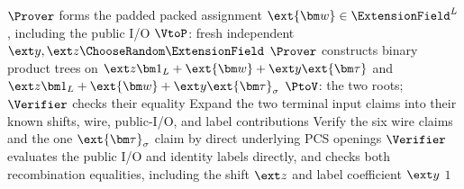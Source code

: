\begin{algorithm}[!t]
\(\Prover\) forms the padded packed assignment
\(\ext{\bm w}\in\ExtensionField^L\), including the public I/O\;
\(\VtoP\): fresh independent
\(\ext y,\ext z\ChooseRandom\ExtensionField\)\;
\(\Prover\) constructs binary product trees on
\(\ext z\bm1_L+\ext{\bm w}+\ext y\ext{\bm\tau}\)
and
\(\ext z\bm1_L+\ext{\bm w}+\ext y\ext{\bm\tau}_\sigma\)\;
\(\PtoV\): the two roots; \(\Verifier\) checks their equality\;
Expand the two terminal input claims into their known shifts,
wire, public-I/O, and label contributions\;
Verify the six wire claims and the one
\(\ext{\bm\tau}_\sigma\) claim by direct underlying PCS openings\;
\(\Verifier\) evaluates the public I/O and identity labels
directly, and checks both recombination equalities, including
the shift \(\ext z\) and label coefficient \(\ext y\)\;
\Return \(1\)\;
\end{algorithm}
